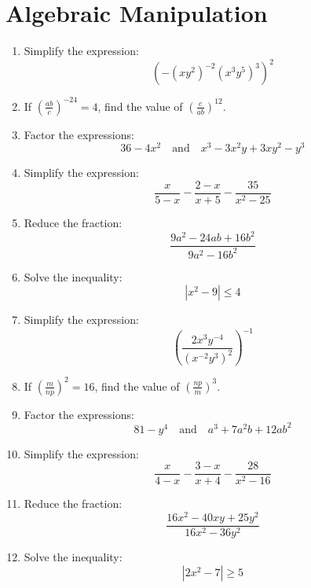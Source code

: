 \documentclass{article}
\begin{document}
\section{Algebraic Manipulation}

\begin{enumerate}[leftmargin = 0.5cm, label = (\alph*), rightmargin = 0.2cm]

    \item Simplify the expression:
    \[
    \left( -(xy^2)^{-2}(x^3y^5)^3 \right)^2
    \]

    \item If \( \left( \frac{ab}{c} \right)^{-24} = 4 \), find the value of \( \left( \frac{c}{ab} \right)^{12} \).

    \item Factor the expressions:
    \[
    36 - 4x^2 \quad \text{and} \quad x^3 - 3x^2y + 3xy^2 - y^3
    \]

    \item Simplify the expression:
    \[
    \frac{x}{5-x} - \frac{2-x}{x+5} - \frac{35}{x^2 - 25}
    \]

    \item Reduce the fraction:
    \[
    \frac{9a^2 - 24ab + 16b^2}{9a^2 - 16b^2}
    \]

    \item Solve the inequality:
    \[
    |x^2 - 9| \leq 4
    \]

    \item Simplify the expression:
    \[
    \left( \frac{2x^3y^{-4}}{(x^{-2}y^3)^2} \right)^{-1}
    \]

    \item If \( \left( \frac{m}{np} \right)^2 = 16 \), find the value of \( \left( \frac{np}{m} \right)^3 \).

    \item Factor the expressions:
    \[
    81 - y^4 \quad \text{and} \quad a^3 + 7a^2b + 12ab^2
    \]

    \item Simplify the expression:
    \[
    \frac{x}{4-x} - \frac{3-x}{x+4} - \frac{28}{x^2 - 16}
    \]

    \item Reduce the fraction:
    \[
    \frac{16x^2 - 40xy + 25y^2}{16x^2 - 36y^2}
    \]

    \item Solve the inequality:
    \[
    |2x^2 - 7| \geq 5
    \]


\end{enumerate}
\end{document}

